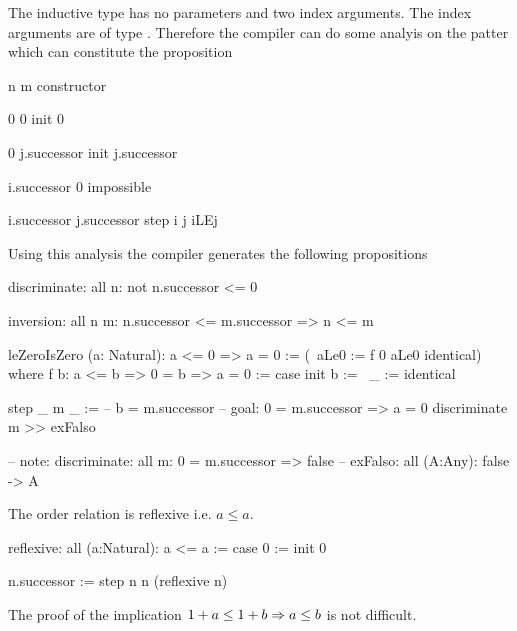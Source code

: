 The inductive type has no parameters and two index arguments. The index
arguments are of type . Therefore the compiler can do some analyis
on the patter which can constitute the proposition 

\begin{alba}
        n               m                   constructor

        0               0                   init 0

        0               j.successor         init j.successor

        i.successor     0                   impossible

        i.successor     j.successor         step i j iLEj
\end{alba}
%
Using this analysis the compiler generates the following propositions
\begin{alba}
    discriminate: all n: not n.successor <= 0

    inversion: all n m: n.successor <= m.successor => n <= m
\end{alba}



\begin{alba}
    leZeroIsZero (a: Natural): a <= 0 => a = 0
    :=
        (\ aLe0 := f 0 aLe0 identical)
        where
            f b: a <= b => 0 = b => a = 0
            :=
                case
                    init b :=
                        \ _ := identical

                    step _ m _ :=
                        -- b = m.successor
                        -- goal: 0 = m.successor => a = 0
                        discriminate m >> exFalso

    -- note: discriminate: all m: 0 = m.successor => false
    --       exFalso:      all (A:Any): false -> A
\end{alba}





\noindent The order relation is reflexive i.e. $a \le a$.

\begin{alba}
    reflexive: all (a:Natural): a <= a :=
        case
            0 :=
                init 0

            n.successor :=
                step n n (reflexive n)
\end{alba}




\noindent The proof of the implication $ 1 + a \le 1 + b \Rightarrow a \le b$ is not
difficult.


